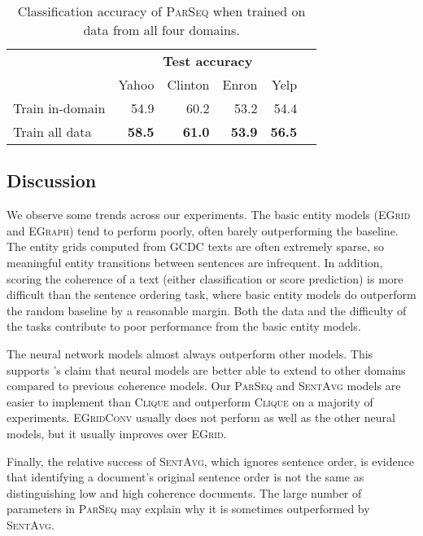 \documentclass[11pt,a4paper]{article}
\newcommand \egrid{\textsc{EGrid}\xspace}
\newcommand \egraph{\textsc{EGraph}\xspace}
\newcommand \parseq{\textsc{ParSeq}\xspace}
\newcommand \clique{\textsc{Clique}\xspace}
\newcommand \sentavg{\textsc{SentAvg}\xspace}
\newcommand \egridconv{\textsc{EGridConv}\xspace}
\newcommand \dataset{\textsc{GCDC}\xspace}
\begin{document}
\begin{table}
\begin{center}
\begin{small}
\begin{tabular}{lrrrrr}
\toprule
& \multicolumn{4}{c}{\textbf{Test accuracy}} \\
& Yahoo & Clinton & Enron & Yelp \\
\midrule
Train in-domain & 54.9 & 60.2 & 53.2 & 54.4 \\
Train all data & \textbf{58.5} & \textbf{61.0} & \textbf{53.9} & \textbf{56.5}  \\
\bottomrule
\end{tabular}
\caption{Classification accuracy of \parseq when trained on data from all four domains. }
\label{tab:concat_domain}
\end{small}
\end{center}
\end{table}

\subsection{Discussion}  \label{sec:results}

We observe some trends across our experiments. The basic entity models (\egrid and \egraph) tend to perform poorly, often barely outperforming the baseline. The entity grids computed from \dataset texts are often extremely sparse, so meaningful entity transitions between sentences are infrequent. In addition, scoring the coherence of a text (either classification or score prediction) is more difficult than the sentence ordering task, where basic entity models do outperform the random baseline by a reasonable margin. Both the data and the difficulty of the tasks contribute to poor performance from the basic entity models.




The neural network models almost always outperform other models. This supports \citet{li-jurafsky:2017:EMNLP}'s claim that neural models are better able to extend to other domains compared to previous coherence models. Our \parseq and \sentavg models are easier to implement than \clique and outperform \clique on a majority of experiments. \egridconv usually does not perform as well as the other neural models, but it usually improves over \egrid.

Finally, the relative success of \sentavg, which ignores sentence order, is evidence that identifying a document's original sentence order is not the same as distinguishing low and high coherence documents. The large number of parameters in \parseq may explain why it is sometimes outperformed by \sentavg.
\end{document}
